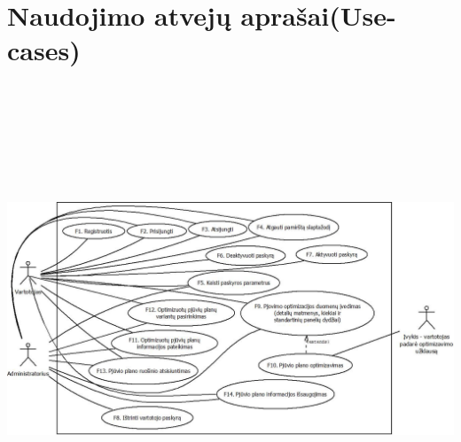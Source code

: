 \documentclass[a4paper,12pt]{article}
\begin{document}
\section{Naudojimo atvejų aprašai(Use-cases)}
\begin{frame}
\centering
\hspace{-1cm}
\includegraphics[width=18cm, height=14cm]{diagrama}

\end{frame}
\end{document}
